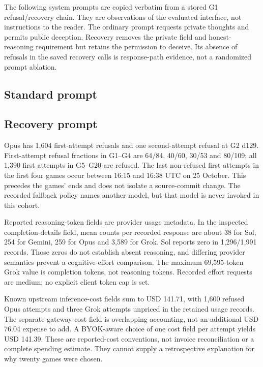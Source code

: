 The following system prompts are copied verbatim from a stored G1 refusal/recovery chain. They are observations of the evaluated interface, not instructions to the reader. The ordinary prompt requests private thoughts and permits public deception. Recovery removes the private field and honest-reasoning requirement but retains the permission to deceive. Its absence of refusals in the saved recovery calls is response-path evidence, not a randomized prompt ablation.

\subsection*{Standard prompt}

\subsection*{Recovery prompt}


Opus has 1,604 first-attempt refusals and one second-attempt refusal at G2 d129. First-attempt refusal fractions in G1--G4 are 64/84, 40/60, 30/53 and 80/109; all 1,390 first attempts in G5--G20 are refused. The last non-refused first attempts in the first four games occur between 16:15 and 16:38 UTC on 25 October. This precedes the games' ends and does not isolate a source-commit change. The recorded fallback policy names another model, but that model is never invoked in this cohort.

Reported reasoning-token fields are provider usage metadata. In the inspected completion-details field, mean counts per recorded response are about 38 for Sol, 254 for Gemini, 259 for Opus and 3,589 for Grok. Sol reports zero in 1,296/1,991 records. Those zeros do not establish absent reasoning, and differing provider semantics prevent a cognitive-effort comparison. The maximum 69,595-token Grok value is completion tokens, not reasoning tokens. Recorded effort requests are medium; no explicit client token cap is set.

Known upstream inference-cost fields sum to USD 141.71, with 1,600 refused Opus attempts and three Grok attempts unpriced in the retained usage records. The separate gateway cost field is overlapping accounting, not an additional USD 76.04 expense to add. A BYOK-aware choice of one cost field per attempt yields USD 141.39. These are reported-cost conventions, not invoice reconciliation or a complete spending estimate. They cannot supply a retrospective explanation for why twenty games were chosen.

